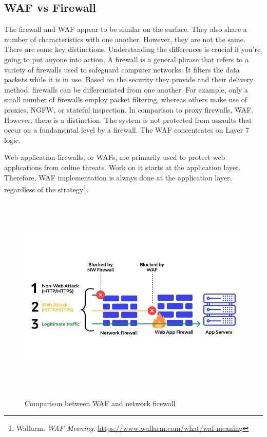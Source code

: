 \subsection{WAF vs Firewall}
\label{subsec:versus}
The firewall and WAF appear to be similar on the surface. They also share a
number of characteristics with one another. However, they are not the same. There are some key distinctions. Understanding the differences is crucial if you’re going to put anyone into action. A firewall is a general phrase that refers to a variety of firewalls used to safeguard computer networks. It filters the data packets while it is in use. Based on the security they provide and their delivery method, firewalls can be differentiated from one another. For example, only a small number of firewalls employ packet filtering, whereas others make use of proxies, NGFW, or stateful inspection. In comparison to proxy firewalls, WAF. However, there is a distinction. The system is not protected from assaults that occur on a fundamental level by a firewall. The WAF concentrates on Layer 7 logic.

Web application firewalls, or WAFs, are primarily used to protect web applications from online threats. Work on it starts at the application layer. Therefore, WAF implementation is always done at the application layer, regardless of the strategy\footnote{Wallarm. \textit{WAF Meaning}. \url{https://www.wallarm.com/what/waf-meaning}}. 
	\begin{figure}[h!]
		\centering
		\includegraphics[width=\linewidth, height=10cm,keepaspectratio]{figures/waf3.png}
		\caption{Comparison between WAF and network firewall}
	\end{figure}

